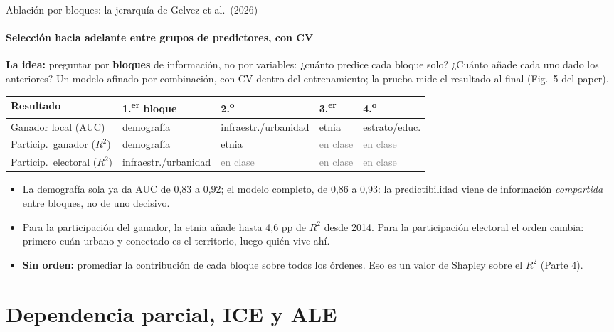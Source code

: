 \documentclass{beamer}
\newcommand{\1}{\mathbb{I}}
\begin{document}
\begin{frame}{Ablación por bloques: la jerarquía de Gelvez et al.\ (2026)}
\framesubtitle{Selección hacia adelante entre grupos de predictores, con CV}
\small
\textbf{La idea:} preguntar por \textbf{bloques} de información, no por variables: ¿cuánto predice cada bloque solo? ¿Cuánto añade cada uno dado los anteriores? Un modelo afinado por combinación, con CV dentro del entrenamiento; la prueba mide el resultado al final (Fig.\ 5 del paper).
\pause
\begin{center}
\scriptsize
\setlength{\tabcolsep}{2pt}
\begin{tabular}{lllll}
\hline
Resultado & 1.\textsuperscript{er} bloque & 2.\textsuperscript{o} & 3.\textsuperscript{er} & 4.\textsuperscript{o} \\
\hline
Ganador local (AUC) & demografía & infraestr./urbanidad & etnia & estrato/educ. \\
Particip.\ ganador ($R^2$) & demografía & etnia & \textcolor{gray}{en clase} & \textcolor{gray}{en clase} \\
Particip.\ electoral ($R^2$) & infraestr./urbanidad & \textcolor{gray}{en clase} & \textcolor{gray}{en clase} & \textcolor{gray}{en clase} \\
\hline
\end{tabular}
\end{center}
\pause
\begin{itemize}\itemsep2pt
  \item La demografía sola ya da AUC de 0,83 a 0,92; el modelo completo, de 0,86 a 0,93: la predictibilidad viene de información \emph{compartida} entre bloques, no de uno decisivo.
  \item Para la participación del ganador, la etnia añade hasta 4,6 pp de $R^2$ desde 2014. Para la participación electoral el orden cambia: primero cuán urbano y conectado es el territorio, luego quién vive ahí.
  \item \textbf{Sin orden:} promediar la contribución de cada bloque sobre todos los órdenes. Eso es un valor de Shapley sobre el $R^2$ (Parte 4).
\end{itemize}
\end{frame}


\section{Dependencia parcial, ICE y ALE}
\begin{frame}[noframenumbering]
\tableofcontents[currentsection]
\end{frame}
\end{document}
